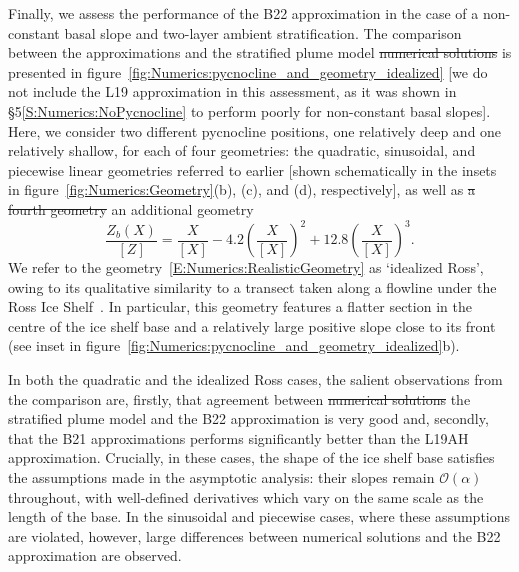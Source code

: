 \documentclass[openacc]{rsproca_new}%
\newcommand{\order}[1]{\mathcal{O}(#1)}
\newcommand{\red}[1]{{\color{red} #1}}
\newcommand{\blue}[1]{{\color{blue} #1}}
\newcommand{\rout}[1]{\red{\st{#1}}}\newcommand{\ab}[1]{\textcolor{Green}{#1}}\newcommand{\about}[1]{\textcolor{Cyan}{\sout{#1}}}
\begin{document}
Finally, we assess the performance of the B22 approximation in the case of a non-constant basal slope and two-layer ambient stratification. The comparison between the approximations and \blue{the stratified plume model} \rout{numerical solutions} is presented in figure~\ref{fig:Numerics:pycnocline_and_geometry_idealized} [we do not include the L19 approximation in this assessment, as it was shown in \S5\ref{S:Numerics:NoPycnocline} to perform poorly for non-constant basal slopes]. Here, we consider two different pycnocline positions, one relatively deep and one relatively shallow, for each of four geometries: the quadratic, sinusoidal, and piecewise linear geometries referred to earlier [shown schematically in the insets in figure~\ref{fig:Numerics:Geometry}(b), (c), and (d), respectively], as well as \rout{a fourth geometry} \blue{an additional geometry} 
\begin{equation}\label{E:Numerics:RealisticGeometry}
\frac{Z_b(X)}{\left[Z\right]}= \frac{X}{\left[X\right]} -4.2\left(\frac{X}{\left[X\right]}\right)^2 + 12.8\left(\frac{X}{\left[X\right]}\right)^3.
\end{equation}
We refer to the geometry~\eqref{E:Numerics:RealisticGeometry} as `idealized Ross', owing to its qualitative similarity to a transect taken along a flowline under the Ross Ice Shelf~\cite{Shabtaie1987JGeophysResSolidEarth}. In particular, this geometry features a flatter section in the centre of the ice shelf base and a relatively large positive slope close to its front (see inset in figure~\ref{fig:Numerics:pycnocline_and_geometry_idealized}b).

In both the quadratic and the idealized Ross cases, the salient observations from the comparison are, firstly, that agreement between \rout{numerical solutions}\blue{the stratified plume model} and the B22 approximation is very good and, secondly, that the B21 approximations performs significantly better than the L19AH approximation. Crucially, in these cases, the shape of the ice shelf base satisfies the assumptions made in the asymptotic analysis: their slopes remain $\order{\alpha}$ throughout, with well-defined derivatives which vary on the same scale as the length of the base. In the sinusoidal and piecewise cases, where these assumptions are violated, however, large differences between numerical solutions and the B22 approximation are observed.
\end{document}
